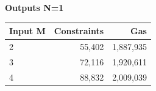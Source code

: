 \par\medskip\noindent
\begin{center}
{\small\setlength{\tabcolsep}{7pt}\renewcommand{\arraystretch}{1.12}
\textbf{Outputs N=1}\par\smallskip
\begin{tabular}{@{}lrr@{}}\toprule
\textbf{Input M} & \textbf{Constraints} & \textbf{Gas} \\
\midrule
2 & 55,402 & 1,887,935 \\
3 & 72,116 & 1,920,611 \\
4 & 88,832 & 2,009,039 \\
\bottomrule\end{tabular}}
\end{center}
\par\medskip
